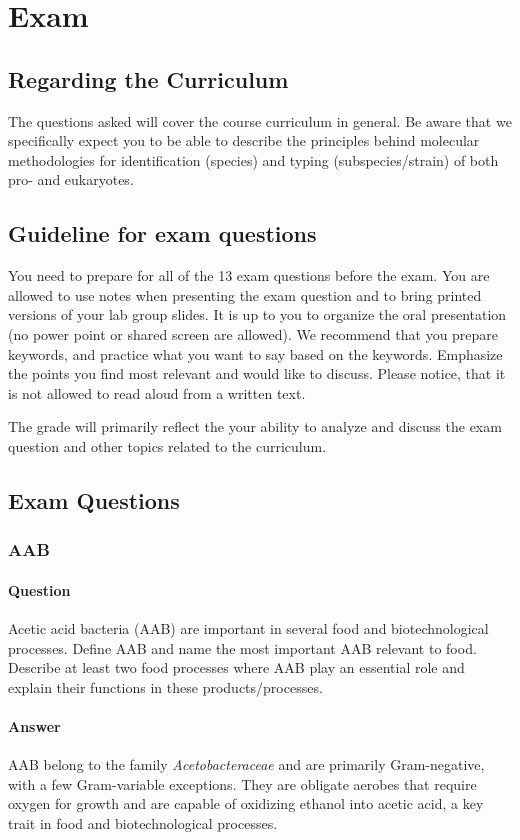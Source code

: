 \chapter{Exam}

\section{Regarding the Curriculum}
The questions asked will cover the course curriculum in general. Be aware that we specifically expect you to be able to describe the principles behind molecular methodologies for identification (species) and typing (subspecies/strain) of both pro- and eukaryotes.  

\section{Guideline for exam questions}
You need to prepare for all of the 13 exam questions before the exam. You are allowed to use notes when presenting the exam question and to bring printed versions of your lab group slides. It is up to you to organize the oral presentation (no power point or shared screen are allowed). We recommend that you prepare keywords, and practice what you want to say based on the keywords. Emphasize the points you find most relevant and would like to discuss. Please notice, that it is not allowed to read aloud from a written text.  

The grade will primarily reflect the your ability to analyze and discuss the exam question and other topics related to the curriculum. 

\section{Exam Questions}

\subsection{AAB}
\subsubsection*{Question}
Acetic acid bacteria (AAB) are important in several food and biotechnological processes. Define AAB and name the most important AAB relevant to food. Describe at least two food processes where AAB play an essential role and explain their functions in these products/processes.

\subsubsection*{Answer}
AAB belong to the family \textit{Acetobacteraceae} and are primarily Gram-negative, with a few Gram-variable exceptions. They are obligate aerobes that require oxygen for growth and are capable of oxidizing ethanol into acetic acid, a key trait in food and biotechnological processes.

